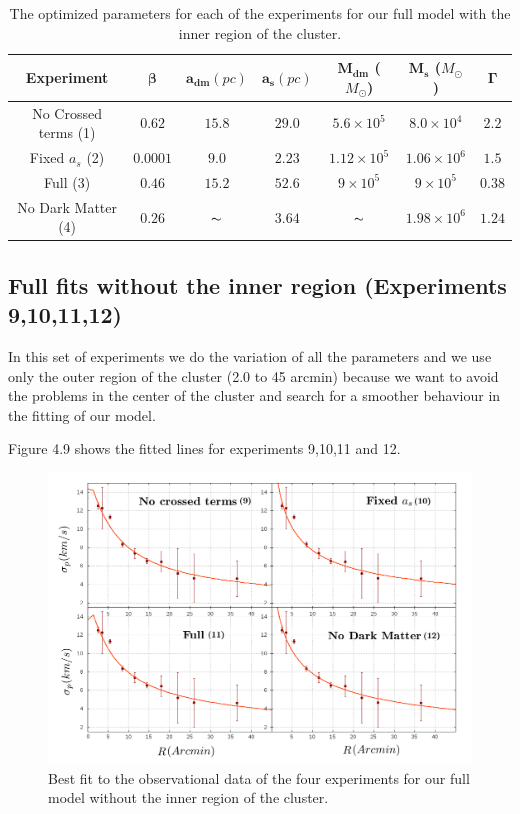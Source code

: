 \begin{table}[H]
\begin{center}
\begin{tabular}{| c | c | c | c | c | c | c| }
    \hline
    \textbf{Experiment} & $\mathbf{\beta}$ & $\mathbf{a_{dm}} (pc)$ & $\mathbf{a_{s}} (pc)$ & $\mathbf{M_{dm}}$ ($M_{\odot}$) & $\mathbf{M_{s}}$ ($M_{\odot}$) & $\mathbf{\Gamma}$\\ \hline
	No Crossed terms (1) & $0.62$ &	$15.8$ &	$29.0$ &	$5.6 \times 10^{5}$ &	$8.0 \times 10^{4}$ &	$2.2$\\ \hline
	Fixed $a_s$ (2) &	$0.0001$ &	$9.0$ &	$2.23$ &	$1.12 \times 10^{5}$ &	$1.06 \times 10 ^{6}$ &	$1.5$\\ \hline
	Full (3) &	$0.46$ &	$15.2$ &	$52.6$ &	$9 \times 10^{5}$ &	$9 \times 10^{5}$ &	$0.38$\\ \hline
	No Dark Matter (4) &	$0.26$ & $\thicksim$	& $3.64$  & $\thicksim$ & $  1.98 \times 10^{6}$ & 	$1.24$\\
    \hline
  \end{tabular} 
\caption[Optimized parameters for our full model with the inner region.]{The optimized parameters for each of the experiments for our full model with the inner region of the cluster. }
\end{center}
\end{table}

\subsection{Full fits without the inner region (Experiments 9,10,11,12)}

In this set of experiments we do the variation of all the parameters and we use only the outer region of the cluster (2.0 to 45 arcmin) because we want to avoid the problems in the center of the cluster and search for a smoother behaviour in the fitting of our model. 

Figure 4.9 shows the fitted lines for experiments 9,10,11 and 12.

\begin{figure}[H]
\centering
\includegraphics[width=15cm]{images/all_params_refinado_10.png}
\caption[Best fit of the full model without the inner region]{Best fit to the observational data of the four experiments for our full model without the inner region of the cluster.}
\end{figure}

